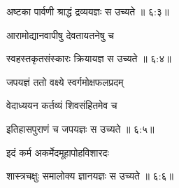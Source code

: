{\devanagarifont अष्टका पार्वणी श्राद्धं द्रव्ययज्ञः स उच्यते {॥ ६:३॥} \veg\dontdisplaylinenum }%



{\devanagarifont आरामोद्यानवापीषु देवतायतनेषु च \thinspace{\dandab} \dontdisplaylinenum }%


{\devanagarifont स्वहस्तकृतसंस्कारः क्रियायज्ञ स उच्यते {॥ ६:४॥} \veg\dontdisplaylinenum }%

\vfill
\pageparbreak
\vers



{\devanagarifont जपयज्ञं ततो वक्ष्ये स्वर्गमोक्षफलप्रदम् \thinspace{\dandab} \dontdisplaylinenum }%

{\devanagarifont वेदाध्ययन कर्तव्यं शिवसंहितमेव च  \danda\dontdisplaylinenum }%


{\devanagarifont इतिहासपुराणं च जपयज्ञः स उच्यते {॥ ६:५॥} \veg\dontdisplaylinenum }%



{\devanagarifont इदं कर्म अकर्मेदमूहापोहविशारदः \thinspace{\dandab} \dontdisplaylinenum }%


{\devanagarifont शास्त्रचक्षुः समालोक्य ज्ञानयज्ञः स उच्यते {॥ ६:६॥} \veg\dontdisplaylinenum }%




